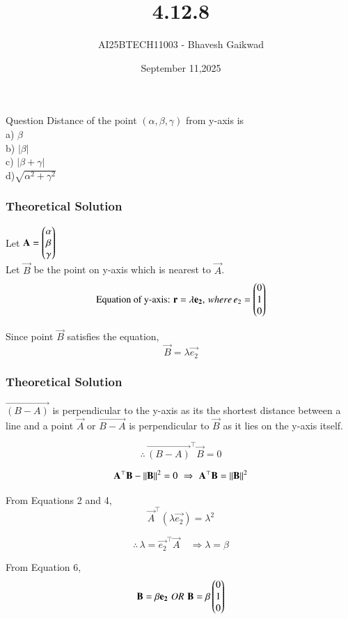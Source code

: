 \documentclass{beamer}
\title
{4.12.8}
\date{September 11,2025}
\author 
{AI25BTECH11003 - Bhavesh Gaikwad}
\begin{document}
\frame{\titlepage}
\begin{frame}{Question}
Distance of the point $(\alpha, \beta, \gamma)$ from y-axis is\\
a) $\beta$\\
b) $|\beta|$\\
c) $|\beta + \gamma|$\\
d)$\sqrt{\alpha^2 + \gamma^2}$ \\
\end{frame}


\begin{frame}[fragile]
    \frametitle{Theoretical Solution}
Let $\mathbf{A} = \begin{pmatrix}\alpha \\ \beta \\ \gamma\end{pmatrix}$\\
Let $\vec{B}$ be the point on y-axis which is nearest to $\vec{A}$.\\


\begin{equation}
\text{Equation of y-axis: } \mathbf{r} = \lambda \mathbf{e_2}, \, where \, e_2=\begin{pmatrix}0 \\ 1 \\ 0\end{pmatrix}
\end{equation}


Since point $\vec{B}$ satisfies the equation,
\begin{equation}
    \vec{B} = \lambda \vec{e_2}
\end{equation}
\end{frame}

\begin{frame}[fragile]
    \frametitle{Theoretical Solution}
$\vec{(B-A)}$ is perpendicular to the y-axis as its the shortest distance between a line and a point $\vec{A}$ or $\vec{B-A}$ is perpendicular to $\vec{B}$ as it lies on the y-axis itself.

\begin{equation}
    \therefore \, \vec{(B-A)}^\top\vec{B} = 0
\end{equation}

\begin{equation}
    \mathbf{A}^\top\mathbf{B} - \left\lVert\mathbf{B}\right\rVert^2 = 0 \, \, \Rightarrow \, \,
    \mathbf{A}^\top\mathbf{B} = \left\lVert\mathbf{B}\right\rVert^2
\end{equation}

From Equations 2 and 4,
\begin{equation}
    \vec{A}^\top (\lambda\vec{e_2})=\lambda^2
\end{equation}

\begin{equation}
    \therefore \, \lambda = \vec{e_2}^\top\vec{A} \quad \Rightarrow
    \lambda = \beta 
\end{equation}

From Equation 6,
\begin{equation}
    \mathbf{B} = \beta\mathbf{e_2} \, \, OR \, \, \mathbf{B} = \beta\begin{pmatrix}0 \\ 1 \\ 0\end{pmatrix}
\end{equation}
\end{frame}
\end{document}
